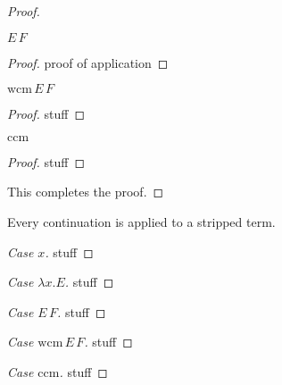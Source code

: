 \documentclass[ms,electronic,twosidetoc,letterpaper,chaptercenter,parttop]{byumsphd}
\begin{document}
\begin{proof}
\begin{case}
$E\,F$
\end{case}
\begin{proof}
proof of application
\end{proof}

\begin{case}
$\mathrm{wcm}\,E\,F$
\end{case}
\begin{proof}
stuff
\end{proof}

\begin{case}
$\mathrm{ccm}$
\end{case}
\begin{proof}
stuff
\end{proof}
This completes the proof.
\end{proof}

\begin{thm}
Every continuation is applied to a stripped term.
\end{thm}

\begin{proof}[Case $x$]
stuff
\end{proof}
\begin{proof}[Case $\lambda x.E$]
stuff
\end{proof}
\begin{proof}[Case $E\,F$]
stuff
\end{proof}
\begin{proof}[Case $\mathrm{wcm}\,E\,F$]
stuff
\end{proof}
\begin{proof}[Case $\mathrm{ccm}$]
stuff
\end{proof}


  


  



\end{document}
